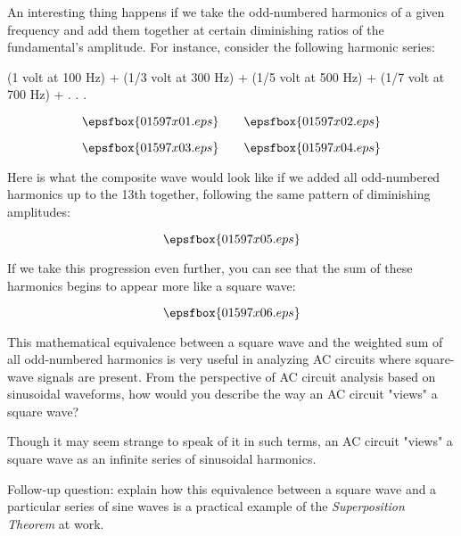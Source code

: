 

An interesting thing happens if we take the odd-numbered harmonics of a given frequency and add them together at certain diminishing ratios of the fundamental's amplitude.  For instance, consider the following harmonic series:

\vskip 10pt

(1 volt at 100 Hz) + (1/3 volt at 300 Hz) + (1/5 volt at 500 Hz) + (1/7 volt at 700 Hz) + . . .

$$\epsfbox{01597x01.eps} \hskip 20pt \epsfbox{01597x02.eps}$$

$$\epsfbox{01597x03.eps} \hskip 20pt \epsfbox{01597x04.eps}$$

Here is what the composite wave would look like if we added all odd-numbered harmonics up to the 13th together, following the same pattern of diminishing amplitudes:

$$\epsfbox{01597x05.eps}$$

If we take this progression even further, you can see that the sum of these harmonics begins to appear more like a square wave:

$$\epsfbox{01597x06.eps}$$

This mathematical equivalence between a square wave and the weighted sum of all odd-numbered harmonics is very useful in analyzing AC circuits where square-wave signals are present.  From the perspective of AC circuit analysis based on sinusoidal waveforms, how would you describe the way an AC circuit "views" a square wave?







Though it may seem strange to speak of it in such terms, an AC circuit "views" a square wave as an infinite series of sinusoidal harmonics.

\vskip 10pt

Follow-up question: explain how this equivalence between a square wave and a particular series of sine waves is a practical example of the {\it Superposition Theorem} at work.







